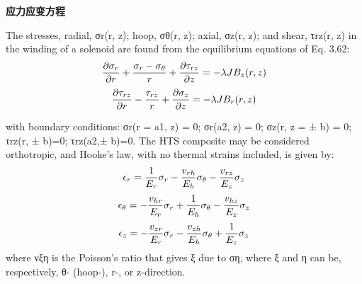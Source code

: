 \textbf{应力应变方程}

The stresses, radial, σr(r, z); hoop, σθ(r, z); axial, σz(r, z); and shear, τrz(r, z) in
the winding of a solenoid are found from the equilibrium equations of Eq. 3.62:
$$
\frac{\partial\sigma_{r}}{\partial r}+\frac{\sigma_{r}-\sigma_{\theta}}{r}+\frac{\partial\tau_{rz}}{\partial z}=-\lambda JB_{z}(r,z)\\%
$$
$$
\frac{\partial\tau_{rz}}{\partial r}-\frac{\tau_{rz}}{r}+\frac{\partial\sigma_{z}}{\partial z}=-\lambda JB_{r}(r,z)\\%
$$

with boundary conditions: σr(r = a1, z) = 0; σr(a2, z) = 0; σz(r, z = ± b) = 0;
τrz(r, ± b)=0; τrz(a2,± b)=0. The HTS composite may be considered orthotropic,
and Hooke’s law, with no thermal strains included, is given by:
$$
\epsilon_{r}=\frac{1}{E_{r}}\sigma_{r}-\frac{v_{rh}}{E_{h}}\sigma_{\theta}-\frac{v_{rz}}{E_{z}}\sigma_{z}\\%
$$
$$
\epsilon_{\theta}=-\frac{v_{hr}}{E_{r}}\sigma_{r}+\frac{1}{E_{h}}\sigma_{\theta}-\frac{v_{hz}}{E_{z}}\sigma_{z}\\%
$$
$$
\epsilon_{z}=-\frac{v_{zr}}{E_{r}}\sigma_{r}-\frac{v_{zh}}{E_{h}}\sigma_{\theta}+\frac{1}{E_{z}}\sigma_{z}\\%
$$
where νξη is the Poisson’s ratio that gives ξ due to ση, where ξ and η can be,
respectively, θ- (hoop-), r-, or z-direction.


